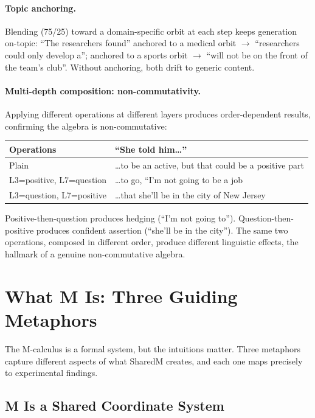 \documentclass[11pt, a4paper]{article}
\theoremstyle{plain}
\theoremstyle{definition}
\theoremstyle{remark}
\begin{document}
\paragraph{Topic anchoring.}
Blending (75/25) toward a domain-specific orbit at each step keeps generation on-topic:
``The researchers found'' anchored to a medical orbit $\to$ ``researchers could only develop a'';
anchored to a sports orbit $\to$ ``will not be on the front of the team's club''.
Without anchoring, both drift to generic content.

\paragraph{Multi-depth composition: non-commutativity.}
Applying different operations at different layers produces order-dependent results, confirming the algebra is non-commutative:
\begin{center}\small
\begin{tabular}{lp{8cm}}
\toprule
\textbf{Operations} & \textbf{``She told him\ldots''} \\
\midrule
Plain & \ldots to be an active, but that could be a positive part \\
L3=positive, L7=question & \ldots to go, ``I'm not going to be a job \\
L3=question, L7=positive & \ldots that she'll be in the city of New Jersey \\
\bottomrule
\end{tabular}
\end{center}
Positive-then-question produces hedging (``I'm not going to'').
Question-then-positive produces confident assertion (``she'll be in the city'').
The same two operations, composed in different order, produce different linguistic effects, the hallmark of a genuine non-commutative algebra.

\section{What M Is: Three Guiding Metaphors}
\label{sec:metaphors}

The M-calculus is a formal system, but the intuitions matter.
Three metaphors capture different aspects of what SharedM creates, and each one maps precisely to experimental findings.

\subsection{M Is a Shared Coordinate System}
\end{document}
